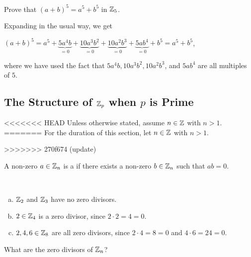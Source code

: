 \documentclass[11pt,fleqn,dvipsnames,usenames]{article}
\newcommand{\p}{\noindent}
\begin{document}
%
\begin{example}
Prove that $(a+b)^{5} = a^{5} + b^{5}$ in $\mathbb{Z}_5$.
\end{example}
\begin{solution}
Expanding in the usual way, we get
\begin{center}
$(a + b)^5 = a^{5} + \underbrace{5a^4b}_{=0} + \underbrace{10a^3b^2}_{=0} + \underbrace{10a^2b^3}_{=0} + \underbrace{5ab^4}_{=0} + b^5 = a^5 + b^5$,
\end{center}
where we have used the fact that $5a^4b, 10a^3b^2, 10a^2b^3$, and $5ab^4$ are all multiples of $5$.
\end{solution}
%

\subsection{The Structure of $\mathbb{Z}_p$ when $p$ is Prime}
<<<<<<< HEAD
\p Unless otherwise stated, assume $n\in\mathbb{Z}$ with $n > 1$.  
=======
\p For the duration of this section, let $n\in\mathbb{Z}$ with $n > 1$.
  
>>>>>>> 270f674 (update)
\begin{definition}
A non-zero $a\in\mathbb{Z}_{n}$ is a  if there exists a non-zero $b\in\mathbb{Z}_{n}$ such that $ab = 0$.
\end{definition}
%
\begin{examples}~
\begin{enumerate}[(a)]
\item $\mathbb{Z}_2$ and $\mathbb{Z}_3$ have no zero divisors.
\item $2\in\mathbb{Z}_4$ is a zero divisor, since $2\cdot 2 = 4 = 0$.
\item $2,4,6\in\mathbb{Z}_8$ are all zero divisors, since $2\cdot 4 = 8 = 0$ and $4\cdot 6 = 24 = 0$.
\end{enumerate}
\end{examples}
\vsp

\question What are the zero divisors of $\mathbb{Z}_{n}$?
\vsp
\end{document}

